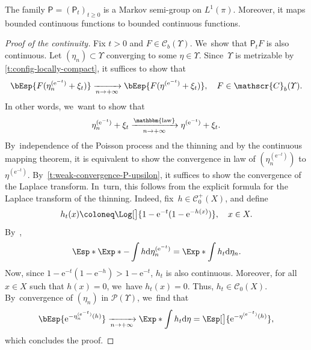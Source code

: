 \documentclass[10pt]{amsart}
\theoremstyle{definition}
\theoremstyle{remark}
\DeclareMathOperator{\law}{\mathbbm{law}}
\begin{document}
The family $\mathsf{P} = (\mathsf{P}_{t})_{t \ge 0}$ is a Markov semi-group on $L^{1}(\pi)$.
Moreover, it maps bounded continuous functions to bounded continuous functions.
\begin{proof}[Proof of the continuity]
Fix $t > 0$ and $F \in \mathscr{C}_{b}(\Upsilon)$. We~show that $\mathsf{P}_{t}F$ is also continuous.
Let $(\eta_{n}) \subset \varUpsilon$ converging to some $\eta \in \varUpsilon$.
Since~$\varUpsilon$ is metrizable by \cref{t:config-locally-compact}, it suffices to show that
\begin{equation*}
\bEsp{F(\eta_{n}^{(\mathrm{e}^{-t})} + \xi_{t})} \xrightarrow[n \to +\infty]{} \bEsp{F(\eta^{(\mathrm{e}^{-t})} + \xi_{t})}, \quad F \in \mathscr{C}_{b}(\varUpsilon).
\end{equation*}
In other words, we~want to show that
\begin{equation*}
\eta_{n}^{(\mathrm{e}^{-t})} + \xi_{t} \xrightarrow[n \to +\infty]{\law} \eta^{(\mathrm{e}^{-t})} + \xi_{t}.
\end{equation*}
By~independence of the Poisson process and the thinning and by the continuous mapping theorem, it is equivalent to show the convergence in law of $(\eta_{n}^{(\mathrm{e}^{-t})})$ to $\eta^{(\mathrm{e}^{-t})}$.
By~\cref{t:weak-convergence-P-upsilon}, it suffices to show the convergence of the Laplace transform.
In~turn, this follows from the explicit formula for the Laplace transform of the thinning.
Indeed, fix~$h \in \mathscr{C}_{0}^{+}(X)$, and define
\begin{equation*}
h_{t}(x) \coloneq \Log[\big]{ 1 - \mathrm{e}^{-t} (1-\mathrm{e}^{-h(x)})}, \quad x \in X.
\end{equation*}
By~\cite[Lem.\,3.1(iv)]{Kallenberg},
\begin{equation*}
\Esp*{ \Exp*{- \int h \mathrm{d} \eta_{n}^{(\mathrm{e}^{-t})}} } = \Exp*{ \int h_{t} \mathrm{d} \eta_{n} }.
\end{equation*}
Now, since $1 - \mathrm{e}^{-t}(1-\mathrm{e}^{-h}) > 1 - \mathrm{e}^{-t}$, $h_{t}$ is also continuous.
Moreover, for all $x \in X$ such that $h(x) = 0$, we~have $h_{t}(x) = 0$.
Thus, $h_{t} \in \mathscr{C}_{0}(X)$.
By~convergence of $(\eta_{n})$ in $\mathscr{P}(\varUpsilon)$, we~find that
\begin{equation*}
\bEsp{ \mathrm{e}^{- \eta_{n}^{(\mathrm{e}^{-t})}(h)} } \xrightarrow[n \to +\infty]{} \Exp*{ \int h_{t} \mathrm{d} \eta } = \Esp[\big]{ \mathrm{e}^{- \eta^{(\mathrm{e}^{-t})}(h)}},
\end{equation*}
which concludes the proof.
\end{proof}
\end{document}
